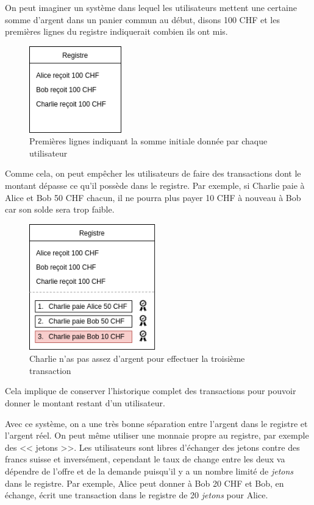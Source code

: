 On peut imaginer un système dans lequel les utilisateurs mettent une certaine somme d'argent dans un panier commun au début, disons 100 CHF et les premières lignes du registre indiquerait combien ils ont mis.

\begin{figure}[H]
  \centering
  \includegraphics[width=4cm]{images/crypto_6.png}
  \caption{Premières lignes indiquant la somme initiale donnée par chaque utilisateur}
\end{figure}

Comme cela, on peut empêcher les utilisateurs de faire des transactions dont le montant dépasse ce qu'il possède dans le registre. Par exemple, si Charlie paie à Alice et Bob 50 CHF chacun, il ne pourra plus payer 10 CHF à nouveau à Bob car son solde sera trop faible.

\begin{figure}[H]
  \centering
  \includegraphics[width=5.5cm]{images/crypto_7.png}
  \caption{Charlie n'as pas assez d'argent pour effectuer la troisième transaction}
\end{figure}

Cela implique de conserver l'historique complet des transactions pour pouvoir donner le montant restant d'un utilisateur.

Avec ce système, on a une très bonne séparation entre l'argent dans le registre et l'argent réel. On peut même utiliser une monnaie propre au registre, par exemple des << jetons >>. Les utilisateurs sont libres d'échanger des jetons contre des francs suisse et inversément, cependant le taux de change entre les deux va dépendre de l'offre et de la demande puisqu'il y a un nombre limité de \emph{jetons} dans le registre. Par exemple, Alice peut donner à Bob 20 CHF et Bob, en échange, écrit une transaction dans le registre de 20 \emph{jetons} pour Alice.

